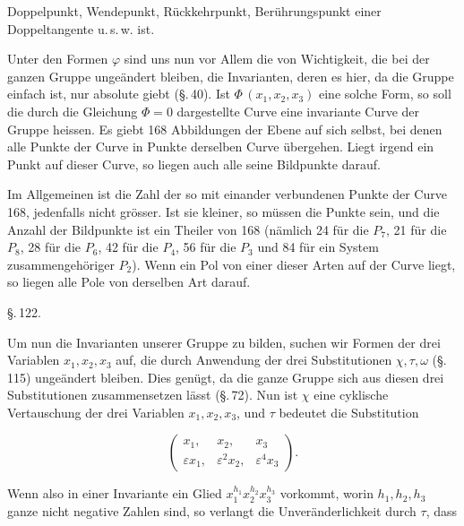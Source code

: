 
Doppelpunkt, Wendepunkt, Rückkehrpunkt, Berührungspunkt einer Doppeltangente u.\,s.\,w. ist.

Unter den Formen $\varphi$ sind uns nun vor Allem die von Wichtigkeit, die bei der ganzen Gruppe ungeändert bleiben, die Invarianten, deren es hier, da die Gruppe einfach ist, nur absolute giebt (\S.\,40). Ist $\Phi\,(x_1, x_2, x_3)$ eine solche Form, so soll die durch die Gleichung $\Phi = 0$ dargestellte Curve eine invariante Curve der Gruppe heissen. Es giebt 168 Abbildungen der Ebene auf sich selbst, bei denen alle Punkte der Curve in Punkte derselben Curve übergehen. Liegt irgend ein Punkt auf dieser Curve, so liegen auch alle seine Bildpunkte darauf.

Im Allgemeinen ist die Zahl der so mit einander verbundenen Punkte der Curve 168, jedenfalls nicht grösser. Ist sie kleiner, so müssen die Punkte  sein, und die Anzahl der Bildpunkte ist ein Theiler von 168 (nämlich 24 für die $P_7$, 21 für die $P_8$, 28 für die $P_6$, 42 für die $P_4$, 56 für die $P_3$ und 84 für ein System zusammengehöriger $P_2$). Wenn ein Pol von einer dieser Arten auf der Curve liegt, so liegen alle Pole von derselben Art darauf.

\begin{center}
\S.\,122.\\
\end{center}

Um nun die Invarianten unserer Gruppe zu bilden, suchen wir Formen der drei Variablen $x_1, x_2, x_3$ auf, die durch Anwendung der drei Substitutionen $\chi, \tau, \omega$ (\S.\,115) ungeändert bleiben. Dies genügt, da die ganze Gruppe sich aus diesen drei Substitutionen zusammensetzen lässt (\S.\,72). Nun ist $\chi$ eine cyklische Vertauschung der drei Variablen $x_1, x_2, x_3$, und $\tau$ bedeutet die Substitution

\[
\begin{pmatrix} x_1, & x_2, & x_3 \\ \varepsilon x_1, & \varepsilon^2 x_2, & \varepsilon^4 x_3 \end{pmatrix}.
\]

Wenn also in einer Invariante ein Glied $x_1^{h_1} x_2^{h_2} x_3^{h_3}$ vorkommt, worin $h_1, h_2, h_3$ ganze nicht negative Zahlen sind, so verlangt die Unveränderlichkeit durch $\tau$, dass

